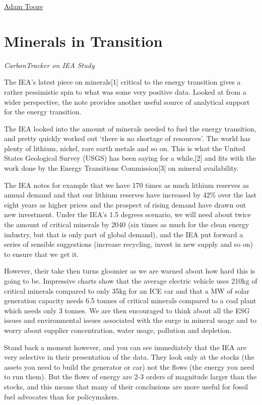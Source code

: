 \documentclass[
]{book}
\begin{document}
\href{https://adamtooze.substack.com/p/chartbook-newsletter-17}{Adam Tooze}

\hypertarget{minerals-in-transition}{%
\section{Minerals in Transition}\label{minerals-in-transition}}

\emph{CarbonTracker on IEA Study}

The IEA's latest piece on minerals{[}1{]} critical to the energy transition gives a rather pessimistic spin to what was some very positive data. Looked at from a wider perspective, the note provides another useful source of analytical support for the energy transition.

The IEA looked into the amount of minerals needed to fuel the energy transition, and pretty quickly worked out `there is no shortage of resources'. The world has plenty of lithium, nickel, rare earth metals and so on. This is what the United States Geological Survey (USGS) has been saying for a while,{[}2{]} and fits with the work done by the Energy Transitions Commission{[}3{]} on mineral availability.

The IEA notes for example that we have 170 times as much lithium reserves as annual demand and that our lithium reserves have increased by 42\% over the last eight years as higher prices and the prospect of rising demand have drawn out new investment. Under the IEA's 1.5 degrees scenario, we will need about twice the amount of critical minerals by 2040 (six times as much for the clean energy industry, but that is only part of global demand), and the IEA put forward a series of sensible suggestions (increase recycling, invest in new supply and so on) to ensure that we get it.

However, their take then turns gloomier as we are warned about how hard this is going to be. Impressive charts show that the average electric vehicle uses 210kg of critical minerals compared to only 35kg for an ICE car and that a MW of solar generation capacity needs 6.5 tonnes of critical minerals compared to a coal plant which needs only 3 tonnes. We are then encouraged to think about all the ESG issues and environmental issues associated with the surge in mineral usage and to worry about supplier concentration, water usage, pollution and depletion.

Stand back a moment however, and you can see immediately that the IEA are very selective in their presentation of the data. They look only at the stocks (the assets you need to build the generator or car) not the flows (the energy you need to run them). But the flows of energy are 2-3 orders of magnitude larger than the stocks, and this means that many of their conclusions are more useful for fossil fuel advocates than for policymakers.
\end{document}
